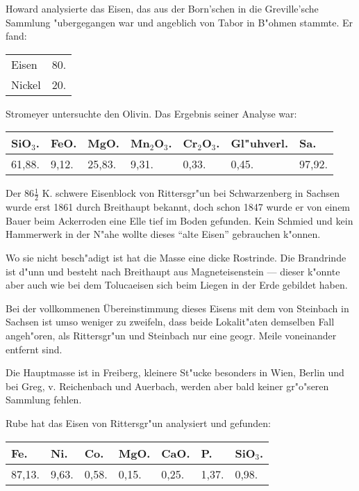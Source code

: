 \documentclass[a4paper, 11pt, oneside]{article}
\begin{document}
Howard analysierte das Eisen, das aus der Born'schen in die Greville'sche Sammlung "ubergegangen war und angeblich von Tabor in B"ohmen stammte. Er fand:
\begin{table}[H]
    \centering\swabfamily\Large
    \begin{tabular}{l r}
        Eisen & 80. \\
        Nickel & 20. \\
    \end{tabular}
\end{table}

Stromeyer untersuchte den Olivin. Das Ergebnis seiner Analyse war:
\begin{table}[H]
    \centering\swabfamily\Large
    \begin{tabular}{l l l l l l l}
        SiO$_{3}$. & FeO. & MgO. & Mn$_{2}$O$_{3}$. & Cr$_{2}$O$_{3}$. & Gl"uhverl. & Sa. \\ \hline
        61,88. & 9,12. & 25,83. & 9,31. & 0,33. & 0,45. & 97,92. \\
    \end{tabular}
\end{table}

Der $86\frac{1}{2}$ K. schwere Eisenblock von Rittersgr"un bei Schwarzenberg in Sachsen wurde erst 1861 durch Breithaupt bekannt, doch schon 1847 wurde er von einem Bauer beim Ackerroden eine Elle tief im Boden gefunden. Kein Schmied und kein Hammerwerk in der N"ahe wollte dieses "`alte Eisen"' gebrauchen k"onnen.

Wo sie nicht besch"adigt ist hat die Masse eine dicke Rostrinde. Die Brandrinde ist d"unn und besteht nach Breithaupt aus Magneteisenstein --- dieser k"onnte aber auch wie bei dem Tolucaeisen sich beim Liegen in der Erde gebildet haben.

Bei der vollkommenen Übereinstimmung dieses Eisens mit dem von Steinbach in Sachsen ist umso weniger zu zweifeln, dass beide Lokalit"aten demselben Fall angeh"oren, als Rittersgr"un und Steinbach nur eine geogr. Meile voneinander entfernt sind.

Die Hauptmasse ist in Freiberg, kleinere St"ucke besonders in Wien, Berlin und bei Greg, v. Reichenbach und Auerbach, werden aber bald keiner gr"o"seren Sammlung fehlen.

Rube hat das Eisen von Rittersgr"un analysiert und gefunden:
\begin{table}[H]
    \centering\swabfamily\Large
    \begin{tabular}{l l l l l l l}
        Fe. & Ni. & Co. & MgO. & CaO. & P. & SiO$_{3}$. \\ \hline
        87,13. & 9,63. & 0,58. & 0,15. & 0,25. & 1,37. & 0,98. \\
    \end{tabular}
\end{table}
\end{document}

